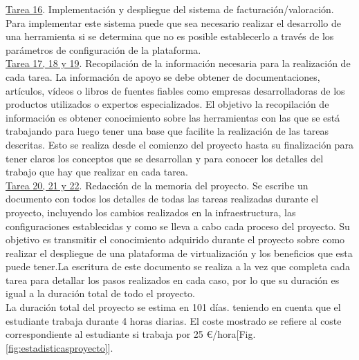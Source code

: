 \underline{Tarea 16}. Implementación y despliegue del sistema de facturación/valoración. Para implementar este sistema puede que sea necesario realizar el desarrollo de una herramienta si se determina que no es posible establecerlo a través de los parámetros de configuración de la plataforma. \\

\underline{Tarea 17, 18 y 19}. Recopilación de la información necesaria para la realización de cada tarea. La información de apoyo se debe obtener de documentaciones, artículos, vídeos o libros de  fuentes fiables como empresas desarrolladoras de los productos utilizados o expertos especializados. El objetivo la recopilación de información es obtener conocimiento sobre las herramientas con las que se está trabajando para luego tener una base que facilite la realización de las tareas descritas. Esto se realiza desde el comienzo del proyecto hasta su finalización para tener claros los conceptos que se desarrollan y para conocer los detalles del trabajo que hay que realizar en cada tarea.\\

\underline{Tarea 20, 21 y 22}. Redacción de la memoria del proyecto. Se escribe un documento con todos los detalles de todas las tareas realizadas durante el proyecto, incluyendo los cambios realizados en la infraestructura, las configuraciones establecidas y como se lleva a cabo cada proceso del proyecto. Su objetivo es transmitir el conocimiento adquirido durante el proyecto sobre como realizar el despliegue de una plataforma de virtualización y los beneficios que esta puede tener.La escritura de este documento se realiza a la vez que completa cada tarea para detallar los pasos realizados en cada caso, por lo que su duración es igual a la duración total de todo el proyecto.\\


La duración total del proyecto se estima en 101 días. teniendo en cuenta que el estudiante trabaja durante 4 horas diarias. El coste mostrado se refiere al coste correspondiente al estudiante si trabaja por 25 €/hora[Fig. \ref{fig:estadisticasproyecto}]. 

